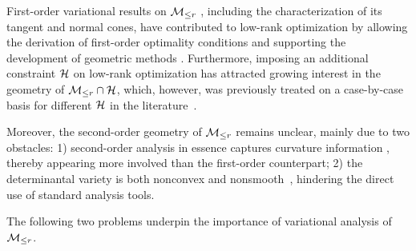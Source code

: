 First-order variational results on $\mathcal{M}_{\le r}$ \cite{luke2013Mordukhovichcone,cason2013iterative,hosseini2019MordukhovichClarke,olikier2022continuity}, including the characterization of its tangent and normal cones, have contributed to low-rank optimization by allowing the derivation of first-order optimality conditions and supporting the development of geometric methods \cite{schneider2015Lojaconvergence,olikier2023RFDR,olikier2025PGD,olikier2025gauss}. Furthermore, imposing an additional constraint $\mathcal{H}$ on low-rank optimization has attracted growing interest in the geometry of $\mathcal{M}_{\le r}\cap\mathcal{H}$, which, however, was previously treated on a case-by-case basis for different $\mathcal{H}$ in the literature~\cite{cason2013iterative,tam2017sparsesdp,li2020jotaspectral,li2023normalboundedaffine,yang2025spacedecouple}.

Moreover, the second-order geometry of $\mathcal{M}_{\le r}$ remains unclear, mainly due to two obstacles: 1) second-order analysis in essence captures curvature information \cite{bonnans2000perturbationanalysis,gfrerer2017robinsonstability}, thereby appearing more involved than the first-order counterpart; 2) the determinantal variety is both nonconvex and nonsmooth~\cite{olikier2022continuity,levin2023remedy}, hindering the direct use of standard analysis tools.

The following two problems underpin the importance of variational analysis of $\mathcal{M}_{\le r}$.




